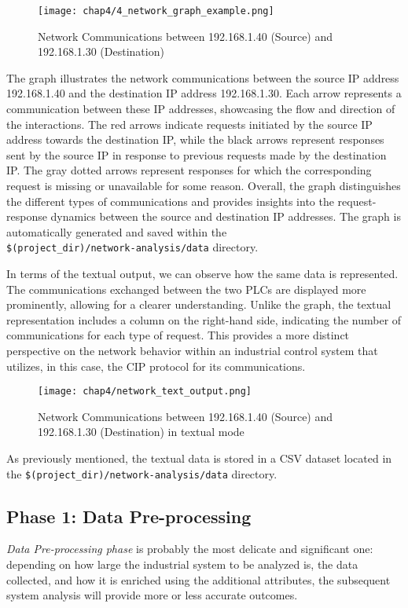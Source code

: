 \begin{figure}[ht]
	\centering
	\texttt{[image: chap4/4\_network\_graph\_example.png]}
	\caption{Network Communications between 192.168.1.40 (Source) and 192.168.1.30 (Destination)}
	\label{fig:4_network_graph_example}
\end{figure}

The graph illustrates the network communications between the source IP address 192.168.1.40 and the destination IP address 192.168.1.30. Each arrow represents a communication between these IP addresses, showcasing the flow and direction of the interactions. The red arrows indicate requests initiated by the source IP address towards the destination IP, while the black arrows represent responses sent by the source IP in response to previous requests made by the destination IP. The gray dotted arrows represent responses for which the corresponding request is missing or unavailable for some reason. Overall, the graph distinguishes the different types of communications and provides insights into the request-response dynamics between the source and destination IP addresses. The graph is automatically generated and saved within the\\ 
\texttt{\$(project\_dir)/network-analysis/data} directory.

\bigskip
In terms of the textual output, we can observe how the same data is represented. The communications exchanged between the two PLCs are displayed more prominently, allowing for a clearer understanding. Unlike the graph, the textual representation includes a column on the right-hand side, indicating the number of communications for each type of request. This provides a more distinct perspective on the network behavior within an industrial control system that utilizes, in this case, the CIP protocol for its communications.

\begin{figure}[ht]
	\centering
	\texttt{[image: chap4/network\_text\_output.png]}
	\caption{Network Communications between 192.168.1.40 (Source) and 192.168.1.30 (Destination) in textual mode}
	\label{fig:4_network_textual_example}
\end{figure}

As previously mentioned, the textual data is stored in a CSV dataset located in the \texttt{\$(project\_dir)/network-analysis/data} directory.

\subsection{Phase 1: Data Pre-processing}
\label{subsec:4_improve_preprocessing}
\textit{Data Pre-processing phase} is probably the most delicate and significant one: depending on how large the industrial system to be analyzed is, the data collected, and how it is enriched using the additional attributes, the subsequent system analysis will provide more or less accurate outcomes.

